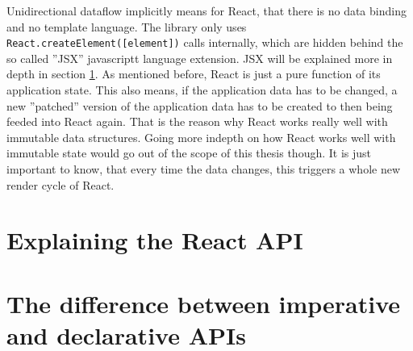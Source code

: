 Unidirectional dataflow implicitly means for React, that there is no data binding and no template language. The library only uses \texttt{React.createElement([element])} calls internally, which are hidden behind the so called ''JSX'' javascriptt language extension. JSX will be explained more in depth in section \ref{sec:reactApi}. As mentioned before, React is just a pure function of its application state. This also means, if the application data has to be changed, a new ''patched'' version of the application data has to be created to then being feeded into React again. That is the reason why React works really well with immutable data structures. Going more indepth on how React works well with immutable state would go out of the scope of this thesis though. It is just important to know, that every time the data changes, this triggers a whole new render cycle of React.

\section{Explaining the React API}
\label{sec:reactApi}


\section{The difference between imperative and declarative APIs}


